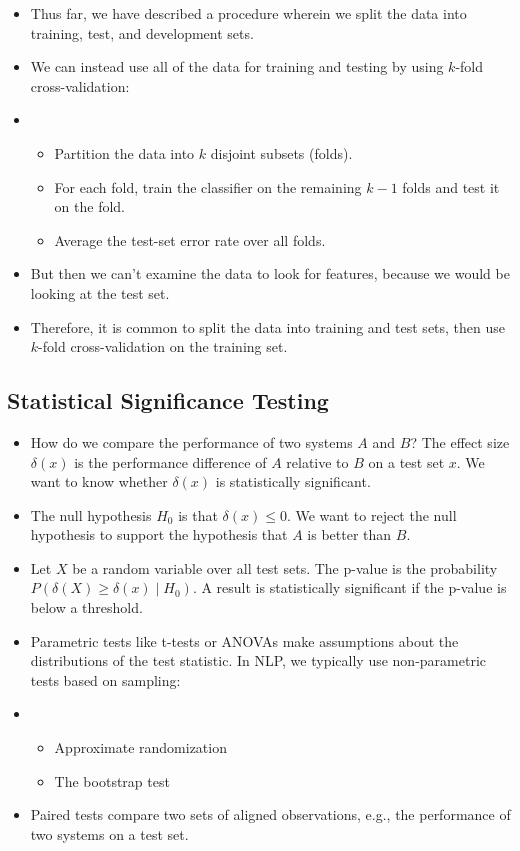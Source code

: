 \begin{itemize}
      \item Thus far, we have described a procedure wherein we split the data into training, test, and development sets.
      \item We can instead use all of the data for training and testing by using $k$-fold cross-validation:
      \item[] \begin{itemize}
                  \item Partition the data into $k$ disjoint subsets (folds).
                  \item For each fold, train the classifier on the remaining $k - 1$ folds and test it on the fold.
                  \item Average the test-set error rate over all folds.
            \end{itemize}
      \item But then we can't examine the data to look for features, because we would be looking at the test set.
      \item Therefore, it is common to split the data into training and test sets, then use $k$-fold cross-validation on the training set.
\end{itemize}

\subsection{Statistical Significance Testing}

\begin{itemize}
      \item How do we compare the performance of two systems $A$ and $B$?
            The effect size $\delta(x)$ is the performance difference of $A$ relative to $B$ on a test set $x$.
            We want to know whether $\delta(x)$ is statistically significant.
      \item The null hypothesis $H_0$ is that $\delta(x) \leq 0$.
            We want to reject the null hypothesis to support the hypothesis that $A$ is better than $B$.
      \item Let $X$ be a random variable over all test sets.
            The p-value is the probability $P(\delta(X) \geq \delta(x) \mid H_0)$.
            A result is statistically significant if the p-value is below a threshold.
      \item Parametric tests like t-tests or ANOVAs make assumptions about the distributions of the test statistic.
            In NLP, we typically use non-parametric tests based on sampling:
      \item[] \begin{itemize}
                  \item Approximate randomization
                  \item The bootstrap test
            \end{itemize}
      \item Paired tests compare two sets of aligned observations, e.g., the performance of two systems on a test set.
\end{itemize}

